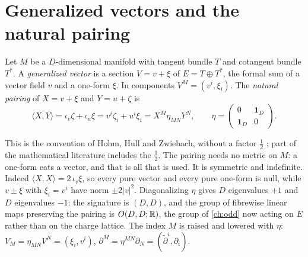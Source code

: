\section{Generalized vectors and the natural pairing}\label{sec:courant:pairing}

\begin{definition}\label{def:courant:genvec}
%
Let $M$ be a $D$-dimensional manifold with tangent bundle $T$ and cotangent bundle $T^*$. A
\emph{generalized vector} is a section $V=v+\xi$ of $E=T\oplus T^*$, the formal sum of a vector
field $v$ and a one-form $\xi$. In components $V^M=(v^i,\xi_i)$. The \emph{natural pairing} of
$X=v+\xi$ and $Y=u+\zeta$ is
\begin{equation}\label{eq:courant:pairing}
\langle X,Y\rangle=\iota_v\zeta+\iota_u\xi=v^i\zeta_i+u^i\xi_i=X^M\eta_{MN}Y^N,\qquad
\eta=\begin{pmatrix}0&\mathbf 1_D\\ \mathbf 1_D&0\end{pmatrix}.
\end{equation}
\end{definition}
This is the convention of Hohm, Hull and Zwiebach, without a factor $\tfrac12$ ; part of the mathematical literature includes the $\tfrac12$. The pairing needs no
metric on $M$: a one-form eats a vector, and that is all that is used. It is symmetric and
indefinite. Indeed $\langle X,X\rangle=2\,\iota_v\xi$, so every pure vector and every pure
one-form is null, while $v\pm\xi$ with $\xi_i=v^i$ have norm $\pm2|v|^2$. Diagonalizing $\eta$
gives $D$ eigenvalues $+1$ and $D$ eigenvalues $-1$: the signature is $(D,D)$, and the group of
fibrewise linear maps preserving the pairing is $O(D,D;\mathbb{R})$, the group of \cref{ch:odd} now acting
on $E$ rather than on the charge lattice. The index $M$ is raised and lowered with $\eta$:
$V_M=\eta_{MN}V^N=(\xi_i,v^i)$, $\partial^M=\eta^{MN}\partial_N=(\tilde\partial^i,\partial_i)$.

